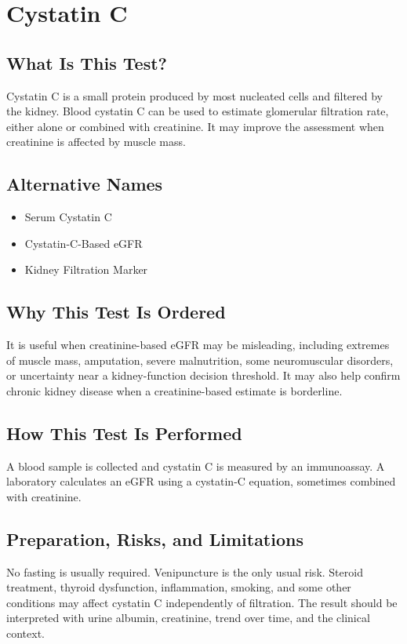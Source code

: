 \chapter{Cystatin C}

\section*{What Is This Test?}
Cystatin C is a small protein produced by most nucleated cells and filtered by the kidney. Blood cystatin C can be used to estimate glomerular filtration rate, either alone or combined with creatinine. It may improve the assessment when creatinine is affected by muscle mass.

\section*{Alternative Names}
\begin{itemize}
  \item Serum Cystatin C
  \item Cystatin-C-Based eGFR
  \item Kidney Filtration Marker
\end{itemize}
\section*{Why This Test Is Ordered}
It is useful when creatinine-based eGFR may be misleading, including extremes of muscle mass, amputation, severe malnutrition, some neuromuscular disorders, or uncertainty near a kidney-function decision threshold. It may also help confirm chronic kidney disease when a creatinine-based estimate is borderline.

\section*{How This Test Is Performed}
A blood sample is collected and cystatin C is measured by an immunoassay. A laboratory calculates an eGFR using a cystatin-C equation, sometimes combined with creatinine.

\section*{Preparation, Risks, and Limitations}
No fasting is usually required. Venipuncture is the only usual risk. Steroid treatment, thyroid dysfunction, inflammation, smoking, and some other conditions may affect cystatin C independently of filtration. The result should be interpreted with urine albumin, creatinine, trend over time, and the clinical context.

